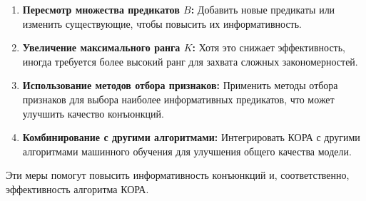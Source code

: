 \begin{enumerate}
    \item \textbf{Пересмотр множества предикатов \( B \):} Добавить новые предикаты или изменить существующие, чтобы повысить их информативность.
    \item \textbf{Увеличение максимального ранга \( K \):} Хотя это снижает эффективность, иногда требуется более высокий ранг для захвата сложных закономерностей.
    \item \textbf{Использование методов отбора признаков:} Применить методы отбора признаков для выбора наиболее информативных предикатов, что может улучшить качество конъюнкций.
    \item \textbf{Комбинирование с другими алгоритмами:} Интегрировать КОРА с другими алгоритмами машинного обучения для улучшения общего качества модели.
\end{enumerate}

Эти меры помогут повысить информативность конъюнкций и, соответственно, эффективность алгоритма КОРА.
